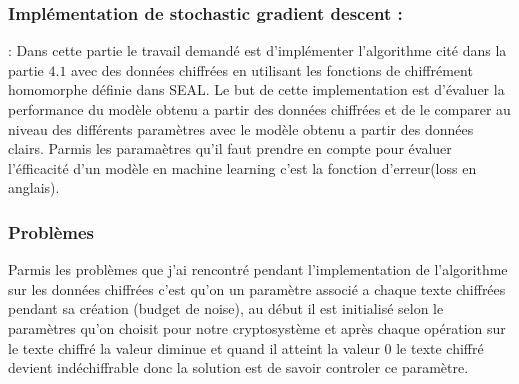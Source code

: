 \documentclass[a4paper,12pt]{article}
\begin{document}
  \subsubsection{Implémentation de stochastic gradient descent : \cite{code_HE}}: 
  Dans cette partie le travail demandé est d'implémenter l'algorithme cité dans la partie $4.1$ avec des données chiffrées en utilisant les fonctions de chiffrément homomorphe définie dans SEAL. \newline 
  Le but de cette implementation est d'évaluer la performance du modèle obtenu a partir des données chiffrées et de le comparer au niveau des différents paramètres avec le modèle obtenu a partir des données clairs.\newline
  Parmis les paramaètres qu'il faut prendre en compte pour évaluer l'éfficacité d'un modèle en machine learning c'est la fonction d'erreur(loss en anglais).\newline  
  \subsubsection{Problèmes}
  Parmis les problèmes que j'ai rencontré pendant l'implementation de l'algorithme  sur les données chiffrées c'est qu'on un paramètre associé a chaque texte chiffrées pendant sa création (budget de noise), au début il est initialisé selon le paramètres qu'on choisit pour notre cryptosystème  et après chaque opération sur le texte chiffré la valeur diminue et quand il atteint la valeur 0 le texte chiffré devient indéchiffrable donc la solution est de savoir controler ce paramètre.
\end{document}
